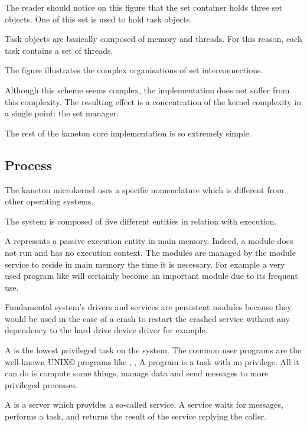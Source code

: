 \begin{multicols}{2}

The reader should notice on this figure that the set container holds
three set objects. One of this set is used to hold task objects.

Task objects are basically composed of memory and threads. For this
reason, each task contains a set of threads.

The figure illustrates the complex organisations of set interconnections.

Although this scheme seems complex, the implementation does not
suffer from this complexity. The resulting effect is a concentration
of the kernel complexity in a single point: the set manager.

The rest of the kaneton core implementation is so extremely simple.

%
%

\subsection{Process}

The kaneton microkernel uses a specific nomenclature which is different
from other operating systems.

The system is composed of five different entities in relation with execution.

A  represents a passive execution entity in main memory.
Indeed, a module does not run and has no execution context. The modules are
managed by the module service to reside in main memory the time it is
necessary. For example a very used program like  will
certainly become an important module due to its frequent use.

Fundamental system's drivers and services are persistent modules because
they would be used in the case of a crash to restart the crashed service
without any dependency to the hard drive device driver for example.

A  is the lowest privileged task on the system.
The common user programs are the well-known UNIX{\scriptsize \copyright}
programs like , , 
\etc{} A program is a task with no privilege. All it can do is compute some
things, manage data and send messages to more privileged processes.

A  is a server which provides a so-called service. A service
waits for messages, performs a task, and returns the result of the service
replying the caller.


\end{multicols}
